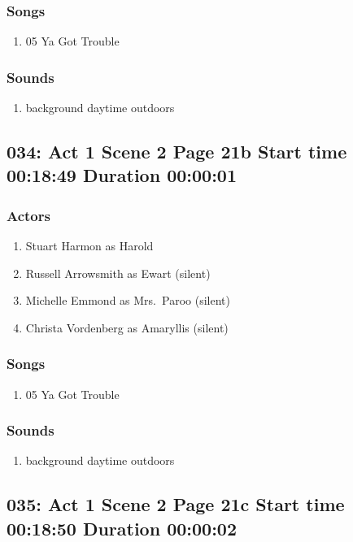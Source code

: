 \subsubsection{Songs}
\begin{enumerate}
\item 05 Ya Got Trouble
\end{enumerate}\subsubsection{Sounds}
\begin{enumerate}
\item background daytime outdoors
\end{enumerate}
\subsection{034: Act 1 Scene 2 Page 21b Start time 00:18:49 Duration 00:00:01}

\subsubsection{Actors}
\begin{enumerate}
\item Stuart Harmon as Harold
\item Russell Arrowsmith as Ewart (silent)
\item Michelle Emmond as Mrs.~Paroo (silent)
\item Christa Vordenberg as Amaryllis (silent)
\end{enumerate}

\subsubsection{Songs}
\begin{enumerate}
\item 05 Ya Got Trouble
\end{enumerate}\subsubsection{Sounds}
\begin{enumerate}
\item background daytime outdoors
\end{enumerate}
\subsection{035: Act 1 Scene 2 Page 21c Start time 00:18:50 Duration 00:00:02}

